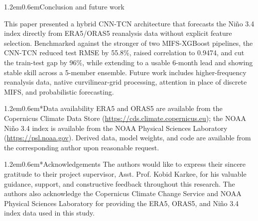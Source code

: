 \documentclass[10pt,a4paper]{article}
\makeatletter
\renewcommand\section{\@startsection{section}{1}{\z@}%
  {1.2em}{0.6em}{\normalfont\fontsize{10}{12}\selectfont\bfseries}}
\makeatother
\begin{document}
\section{Conclusion and future work}

This paper presented a hybrid CNN-TCN architecture that forecasts the Ni\~no 3.4 index directly from ERA5/ORAS5 reanalysis data without explicit feature selection. Benchmarked against the stronger of two MIFS-XGBoost pipelines, the CNN-TCN reduced test RMSE by 55.8\%, raised correlation to 0.9474, and cut the train-test gap by 96\%, while extending to a usable 6-month lead and showing stable skill across a 5-member ensemble. Future work includes higher-frequency reanalysis data, native curvilinear-grid processing, attention in place of discrete MIFS, and probabilistic forecasting.

\section*{Data availability}
ERA5 and ORAS5 are available from the Copernicus Climate Data Store (\url{https://cds.climate.copernicus.eu}); the NOAA Ni\~no 3.4 index is available from the NOAA Physical Sciences Laboratory (\url{https://psl.noaa.gov}). Derived data, model weights, and code are available from the corresponding author upon reasonable request.

\section*{Acknowledgements}
The authors would like to express their sincere gratitude to their project supervisor, Asst. Prof. Kobid Karkee, for his valuable guidance, support, and constructive feedback throughout this research. The authors also acknowledge the Copernicus Climate Change Service and NOAA Physical Sciences Laboratory for providing the ERA5, ORAS5, and Ni\~no 3.4 index data used in this study.

\begingroup
{}
\end{document}
